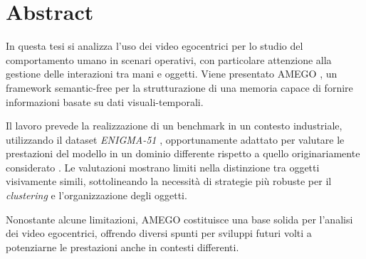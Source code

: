 \chapter*{Abstract} %

In questa tesi si analizza l'uso dei video egocentrici per lo studio del comportamento umano in scenari operativi, con particolare attenzione alla gestione delle interazioni tra mani e oggetti. Viene presentato AMEGO \cite{goletto2024amego}, un framework semantic-free per la strutturazione di una memoria capace di fornire informazioni basate su dati visuali-temporali.

Il lavoro prevede la realizzazione di un benchmark in un contesto industriale, utilizzando il dataset \textit{ENIGMA-51} \cite{ragusa2023enigma51}, opportunamente adattato per valutare le prestazioni del modello in un dominio differente rispetto a quello originariamente considerato \cite{Damen2021PAMI}. Le valutazioni mostrano limiti nella distinzione tra oggetti visivamente simili, sottolineando la necessità di strategie più robuste per il \textit{clustering} e l'organizzazione degli oggetti.

Nonostante alcune limitazioni, \textsc{AMEGO} costituisce una base solida per l'analisi dei video egocentrici, offrendo diversi spunti per sviluppi futuri volti a potenziarne le prestazioni anche in contesti differenti.